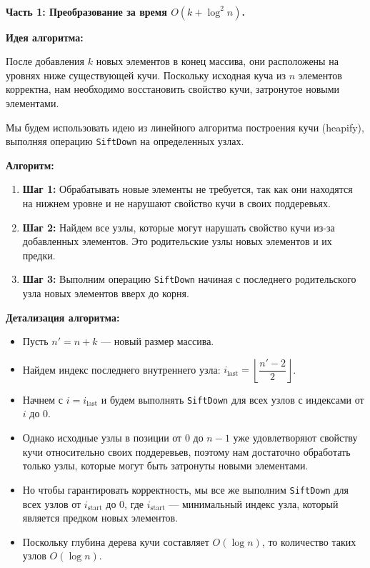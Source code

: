 \documentclass[11pt]{article}
\begin{document}
\begin{solution}
    \\
    \textbf{Часть 1: Преобразование за время $O(k + \log^2 n)$.}

    \textbf{Идея алгоритма:}

    После добавления $k$ новых элементов в конец массива, они расположены на уровнях ниже существующей кучи. Поскольку исходная куча из $n$ элементов корректна, нам необходимо восстановить свойство кучи, затронутое новыми элементами.

    Мы будем использовать идею из линейного алгоритма построения кучи (heapify), выполняя операцию \texttt{SiftDown} на определенных узлах.

    \textbf{Алгоритм:}

    \begin{enumerate}
        \item \textbf{Шаг 1:} Обрабатывать новые элементы не требуется, так как они находятся на нижнем уровне и не нарушают свойство кучи в своих поддеревьях.
        \item \textbf{Шаг 2:} Найдем все узлы, которые могут нарушать свойство кучи из-за добавленных элементов. Это родительские узлы новых элементов и их предки.
        \item \textbf{Шаг 3:} Выполним операцию \texttt{SiftDown} начиная с последнего родительского узла новых элементов вверх до корня.
    \end{enumerate}

    \textbf{Детализация алгоритма:}

    \begin{itemize}
        \item Пусть $n' = n + k$ — новый размер массива.
        \item Найдем индекс последнего внутреннего узла: $i_{\text{last}} = \left\lfloor \dfrac{n' - 2}{2} \right\rfloor$.
        \item Начнем с $i = i_{\text{last}}$ и будем выполнять \texttt{SiftDown} для всех узлов с индексами от $i$ до $0$.
        \item Однако исходные узлы в позиции от $0$ до $n - 1$ уже удовлетворяют свойству кучи относительно своих поддеревьев, поэтому нам достаточно обработать только узлы, которые могут быть затронуты новыми элементами.
        \item Но чтобы гарантировать корректность, мы все же выполним \texttt{SiftDown} для всех узлов от $i_{\text{start}}$ до $0$, где $i_{\text{start}}$ — минимальный индекс узла, который является предком новых элементов.
        \item Поскольку глубина дерева кучи составляет $O(\log n)$, то количество таких узлов $O(\log n)$.
    \end{itemize}


\end{solution}
\end{document}
